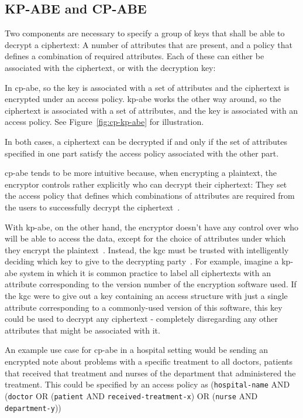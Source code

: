 \subsection{KP-ABE and CP-ABE}

Two components are necessary to specify a group of keys that shall be able to decrypt a ciphertext: A number of attributes that are present, and a policy that defines a combination of required attributes. 
Each of these can either be associated with the ciphertext, or with the decryption key:

In \acrfull{cp-abe}, so the key is associated with a set of attributes and the ciphertext is encrypted under an access policy.
\acrfull{kp-abe} works the other way around, so the ciphertext is associated with a set of attributes, and the key is associated with an access policy.
See Figure~\ref{fig:cp-kp-abe} for illustration.

In both cases, a ciphertext can be decrypted if and only if the set of attributes specified in one part satisfy the access policy associated with the other part.

\acrshort{cp-abe} tends to be more intuitive because, when encrypting a plaintext, the encryptor controls rather explicitly who can decrypt their ciphertext:
They set the access policy that defines which combinations of attributes are required from the users to successfully decrypt the ciphertext~\cite{bethencourt_ciphertext-policy_2007}.

With \acrshort{kp-abe}, on the other hand, the encryptor doesn't have any control over who will be able to access the data, except for the choice of attributes under which they encrypt the plaintext~\cite{bethencourt_ciphertext-policy_2007}.
Instead, the \acrlong{kgc} must be trusted with intelligently deciding which key to give to the decrypting party~\cite{bethencourt_ciphertext-policy_2007}.
For example, imagine a \acrshort{kp-abe} system in which it is common practice to label all ciphertexts with an attribute corresponding to the version number of the encryption software used.
If the \acrshort{kgc} were to give out a key containing an access structure with just a single attribute corresponding to a commonly-used version of this software, this key could be used to decrypt any ciphertext - completely disregarding any other attributes that might be associated with it.

An example use case for \acrshort{cp-abe} in a hospital setting would be sending an encrypted note about problems with a specific treatment to all doctors, patients that received that treatment and nurses of the department that administered the treatment.
This could be specified by an access policy as (\texttt{hospital-name} AND (\texttt{doctor} OR (\texttt{patient} AND \texttt{received-treatment-x}) OR (\texttt{nurse} AND \texttt{department-y}))

